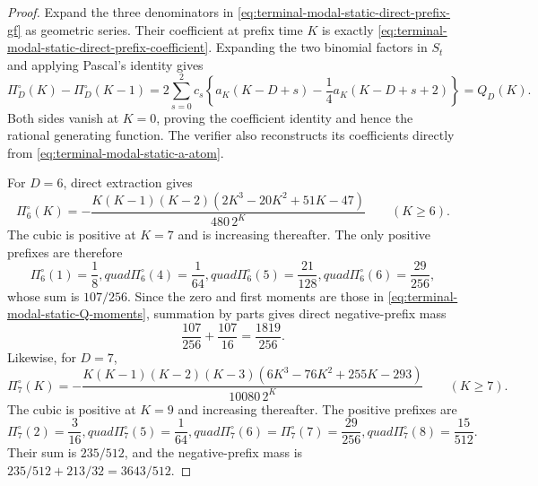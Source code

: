 \begin{proof}
Expand the three denominators in
\eqref{eq:terminal-modal-static-direct-prefix-gf} as geometric series.  Their
coefficient at prefix time $K$ is exactly
\eqref{eq:terminal-modal-static-direct-prefix-coefficient}.  Expanding the
two binomial factors in $S_t$ and applying Pascal's identity gives
\[
 \Pi_D^\circ(K)-\Pi_D^\circ(K-1)
 =2\sum_{s=0}^2c_s\left\{
 a_K(K-D+s)-\frac14a_K(K-D+s+2)\right\}=Q_D(K).
\]
Both sides vanish at $K=0$, proving the coefficient identity and hence the
rational generating function.  The verifier also reconstructs its
coefficients directly from \eqref{eq:terminal-modal-static-a-atom}.

For $D=6$, direct extraction gives
\begin{equation}
 \Pi_6^\circ(K)=
 -\frac{K(K-1)(K-2)(2K^3-20K^2+51K-47)}{480\,2^K}
 \qquad(K\ge6).
 \label{eq:terminal-modal-static-direct-prefix-D6}
\end{equation}
The cubic is positive at $K=7$ and is increasing thereafter.  The only
positive prefixes are therefore
\[
 \Pi_6^\circ(1)=\frac18,quad
 \Pi_6^\circ(4)=\frac1{64},quad
 \Pi_6^\circ(5)=\frac{21}{128},quad
 \Pi_6^\circ(6)=\frac{29}{256},
\]
whose sum is $107/256$.  Since the zero and first moments are those in
\eqref{eq:terminal-modal-static-Q-moments}, summation by parts gives direct
negative-prefix mass
\[
 \frac{107}{256}+\frac{107}{16}=\frac{1819}{256}.
\]
Likewise, for $D=7$,
\begin{equation}
 \Pi_7^\circ(K)=
 -\frac{K(K-1)(K-2)(K-3)
 (6K^3-76K^2+255K-293)}{10080\,2^K}
 \qquad(K\ge7).
 \label{eq:terminal-modal-static-direct-prefix-D7}
\end{equation}
The cubic is positive at $K=9$ and increasing thereafter.  The positive
prefixes are
\[
 \Pi_7^\circ(2)=\frac3{16},quad
 \Pi_7^\circ(5)=\frac1{64},quad
 \Pi_7^\circ(6)=\Pi_7^\circ(7)=\frac{29}{256},quad
 \Pi_7^\circ(8)=\frac{15}{512}.
\]
Their sum is $235/512$, and the negative-prefix mass is
$235/512+213/32=3643/512$.


\end{proof}
